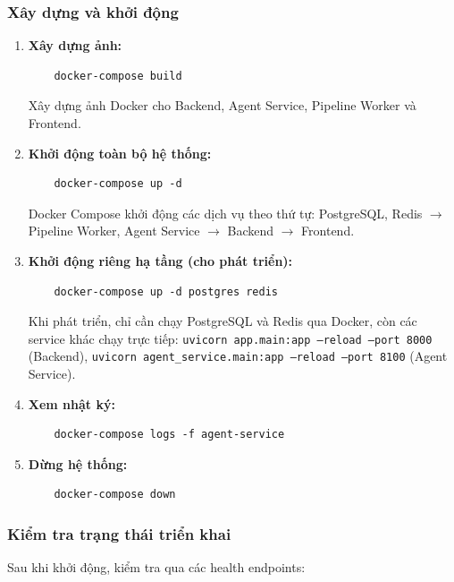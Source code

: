\subsubsection{Xây dựng và khởi động}

\begin{enumerate}
    \item \textbf{Xây dựng ảnh:}
    \begin{verbatim}
    docker-compose build
    \end{verbatim}
    Xây dựng ảnh Docker cho Backend, Agent Service, Pipeline Worker và Frontend.

    \item \textbf{Khởi động toàn bộ hệ thống:}
    \begin{verbatim}
    docker-compose up -d
    \end{verbatim}
    Docker Compose khởi động các dịch vụ theo thứ tự: PostgreSQL, Redis $\rightarrow$ Pipeline Worker, Agent Service $\rightarrow$ Backend $\rightarrow$ Frontend.

    \item \textbf{Khởi động riêng hạ tầng (cho phát triển):}
    \begin{verbatim}
    docker-compose up -d postgres redis
    \end{verbatim}
    Khi phát triển, chỉ cần chạy PostgreSQL và Redis qua Docker, còn các service khác chạy trực tiếp: \texttt{uvicorn app.main:app --reload --port 8000} (Backend), \texttt{uvicorn agent\_service.main:app --reload --port 8100} (Agent Service).

    \item \textbf{Xem nhật ký:}
    \begin{verbatim}
    docker-compose logs -f agent-service
    \end{verbatim}

    \item \textbf{Dừng hệ thống:}
    \begin{verbatim}
    docker-compose down
    \end{verbatim}
\end{enumerate}

\subsubsection{Kiểm tra trạng thái triển khai}

Sau khi khởi động, kiểm tra qua các health endpoints:

